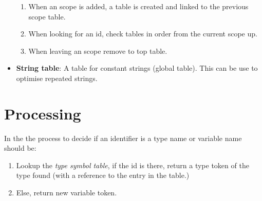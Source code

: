 \documentclass[letterpaper,10pt,english]{sphinxmanual}
\begin{document}
\begin{itemize}
\begin{enumerate}
\item {} 
When an scope is added, a table is created and linked to the
previous scope table.

\item {} 
When looking for an id, check tables in order from the
current scope up.

\item {} 
When leaving an scope remove to top table.

\end{enumerate}

\item {} 
\textbf{String table}: A table for constant strings (global table). This can be use
to optimise repeated strings.

\end{itemize}


\section{Processing}
\label{documentation:processing}
In the  the process to decide if an identifier is a type name or variable name should be:
\begin{enumerate}
\item {} 
Lookup the \emph{type symbol table}, if the id is there, return
a type token of the type found (with a reference to the entry in the
table.)

\item {} 
Else, return new variable token.

\end{enumerate}
\end{document}
